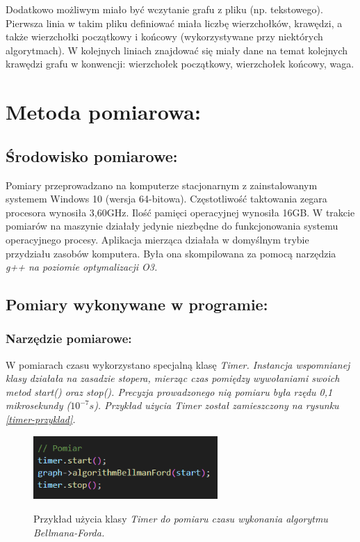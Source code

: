 \documentclass[a4paper,12pt]{article}
\begin{document}
\noindent
Dodatkowo możliwym miało być wczytanie grafu z pliku (np. tekstowego). Pierwsza linia w takim pliku definiować miała liczbę wierzchołków, krawędzi, a także wierzchołki początkowy i końcowy (wykorzystywane przy niektórych algorytmach). W kolejnych liniach znajdować się miały dane na temat kolejnych krawędzi grafu w konwencji: wierzchołek początkowy, wierzchołek końcowy, waga.

\section{Metoda pomiarowa:}

\subsection{Środowisko pomiarowe:}
Pomiary przeprowadzano na komputerze stacjonarnym z zainstalowanym systemem Windows 10 (wersja 64-bitowa). Częstotliwość taktowania zegara procesora wynosiła 3,60GHz. Ilość pamięci operacyjnej wynosiła 16GB. W trakcie pomiarów na maszynie działały jedynie niezbędne do funkcjonowania systemu operacyjnego procesy. Aplikacja mierząca działała w domyślnym trybie przydziału zasobów komputera. Była ona skompilowana za pomocą narzędzia \it g++ \rm na poziomie optymalizacji O3. 

\subsection{Pomiary wykonywane w programie:}

\subsubsection{Narzędzie pomiarowe:}
W pomiarach czasu wykorzystano specjalną klasę \it Timer\rm. Instancja wspomnianej klasy działała na zasadzie stopera, mierząc czas pomiędzy wywołaniami swoich metod \it start() \rm oraz \it stop()\rm. Precyzja prowadzonego nią pomiaru była rzędu 0,1 mikrosekundy ($10^{-7}s$). Przykład użycia \it Timer \rm został zamieszczony na rysunku \ref{timer-przyklad}.
\begin{figure}[H]
	\centering
	\caption{\centering Przykład użycia klasy \it Timer \rm do pomiaru czasu wykonania algorytmu Bellmana-Forda.}
	\includegraphics[width=7cm]{fig2.png}
	\label{fig.timer-przyklad}
\end{figure}
\end{document}
